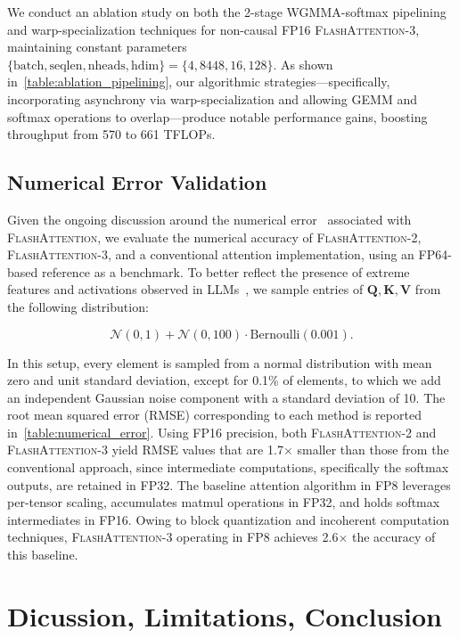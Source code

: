 \begin{algorithm}[H]
\begin{algorithmic}[1]
We conduct an ablation study on both the 2-stage WGMMA-softmax pipelining and warp-specialization techniques for non-causal FP16 \textsc{FlashAttention-3}, maintaining constant parameters $\{\text{batch}, \text{seqlen}, \text{nheads}, \text{hdim}\} = \{ 4, 8448, 16, 128\}$. As shown in~\cref{table:ablation_pipelining}, our algorithmic strategies—specifically, incorporating asynchrony via warp-specialization and allowing GEMM and softmax operations to overlap—produce notable performance gains, boosting throughput from 570 to 661 TFLOPs.

\subsection{Numerical Error Validation}
\label{sec:numerical_error}

Given the ongoing discussion around the numerical error~\citep{golden2024flash} associated with \textsc{FlashAttention}, we evaluate the numerical accuracy of \textsc{FlashAttention-2}, \textsc{FlashAttention-3}, and a conventional attention implementation, using an FP64-based reference as a benchmark. To better reflect the presence of extreme features and activations observed in LLMs~\citep{dettmers2208llm, sun2024massive}, we sample entries of $\mathbf{Q}, \mathbf{K}, \mathbf{V}$ from the following distribution:

\begin{equation*}
  \mathcal{N}(0, 1) + \mathcal{N}(0, 100) \cdot \mathrm{Bernoulli}(0.001).
\end{equation*}

In this setup, every element is sampled from a normal distribution with mean zero and unit standard deviation, except for 0.1\% of elements, to which we add an independent Gaussian noise component with a standard deviation of 10. The root mean squared error (RMSE) corresponding to each method is reported in~\cref{table:numerical_error}. Using FP16 precision, both \textsc{FlashAttention-2} and \textsc{FlashAttention-3} yield RMSE values that are 1.7$\times$ smaller than those from the conventional approach, since intermediate computations, specifically the softmax outputs, are retained in FP32. The baseline attention algorithm in FP8 leverages per-tensor scaling, accumulates matmul operations in FP32, and holds softmax intermediates in FP16. Owing to block quantization and incoherent computation techniques, \textsc{FlashAttention-3} operating in FP8 achieves 2.6$\times$ the accuracy of this baseline.

\section{Dicussion, Limitations, Conclusion}
\label{sec:discussion}


\end{algorithmic}
\end{algorithm}
